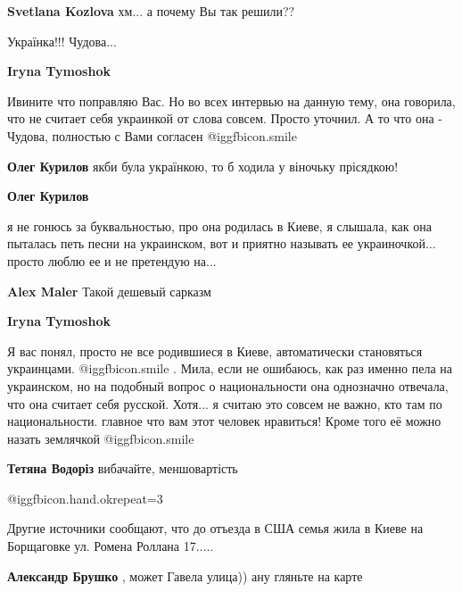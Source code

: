 \begin{itemize}
\begin{itemize}
\begin{itemize}
\textbf{Svetlana Kozlova} хм... а почему Вы так решили??
\end{itemize} %

\end{itemize} %

Українка!!! Чудова...

\begin{itemize} %
\textbf{Iryna Tymoshok} 

Ивините что поправляю Вас. Но во всех интервью на данную тему, она говорила,
что не считает себя украинкой от слова совсем. Просто уточнил. А то что она -
Чудова, полностью с Вами согласен  @igg{fbicon.smile} 

\begin{itemize} %
\textbf{Олег Курилов} якби була українкою, то б ходила у віночьку прісядкою!

\textbf{Олег Курилов} 

я не гонюсь за буквальностью, про она родилась в Киеве, я слышала, как она
пыталась петь песни на украинском, вот и приятно называть ее
украиночкой... просто люблю ее и не претендую на...


\textbf{Alex Maler} Такой дешевый сарказм

\textbf{Iryna Tymoshok} 

Я вас понял, просто не все родившиеся в Киеве, автоматически становяться
украинцами.  @igg{fbicon.smile} . Мила, если не ошибаюсь, как раз именно пела на украинском, но
на подобный вопрос о национальности она однозначно отвечала, что она считает
себя русской. Хотя... я считаю это совсем не важно, кто там по национальности.
главное что вам этот человек нравиться! Кроме того её можно назать землячкой  @igg{fbicon.smile} 

\end{itemize} %

\textbf{Тетяна Водоріз} вибачайте, меншовартість

\end{itemize} %

 @igg{fbicon.hand.ok}{repeat=3} 


Другие источники сообщают, что до отъезда в США семья жила в Киеве на
Борщаговке ул. Ромена Роллана 17.....

\begin{itemize} %
\textbf{Александр Брушко} , может Гавела улица)) ану гляньте на карте


\end{itemize}
\end{itemize}
